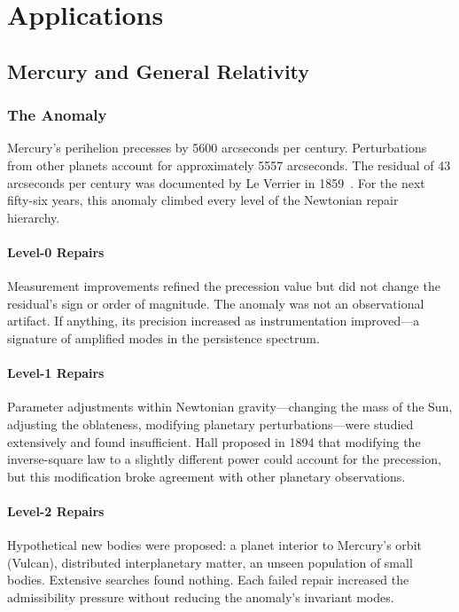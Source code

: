 \documentclass[12pt,oneside]{book}
\theoremstyle{plain}
\theoremstyle{definition}
\theoremstyle{remark}
\newcommand{\1}{\mathbf{1}}
\begin{document}
\part{Applications}

\chapter{Mercury and General Relativity}

\section{The Anomaly}

Mercury's perihelion precesses by 5600 arcseconds per century. Perturbations from other planets account for approximately 5557 arcseconds. The residual of 43 arcseconds per century was documented by Le Verrier in 1859~\cite{will2014}. For the next fifty-six years, this anomaly climbed every level of the Newtonian repair hierarchy.

\subsection{Level-0 Repairs}
Measurement improvements refined the precession value but did not change the residual's sign or order of magnitude. The anomaly was not an observational artifact. If anything, its precision increased as instrumentation improved---a signature of amplified modes in the persistence spectrum.

\subsection{Level-1 Repairs}
Parameter adjustments within Newtonian gravity---changing the mass of the Sun, adjusting the oblateness, modifying planetary perturbations---were studied extensively and found insufficient. Hall proposed in 1894 that modifying the inverse-square law to a slightly different power could account for the precession, but this modification broke agreement with other planetary observations.

\subsection{Level-2 Repairs}
Hypothetical new bodies were proposed: a planet interior to Mercury's orbit (Vulcan), distributed interplanetary matter, an unseen population of small bodies. Extensive searches found nothing. Each failed repair increased the admissibility pressure without reducing the anomaly's invariant modes.
\end{document}
